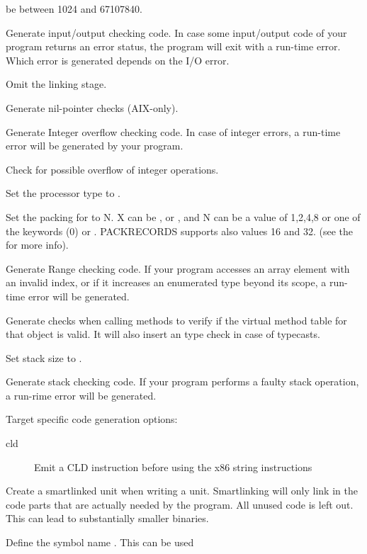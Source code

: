 \begin{description}
be between 1024 and 67107840.
\item [-Ci]  Generate input/output checking code. In case some
input/output code of your program returns an error status, the program will
exit with a run-time error. Which error is generated depends on the I/O error.
\item [-Cn]  Omit the linking stage.
\item [-CN]  Generate nil-pointer checks (AIX-only).
\item [-Co]  Generate Integer overflow checking code. In case of
integer errors, a run-time error will be generated by your program.
\item [-CO]  Check for possible overflow of integer operations.
\item [-CpXXX] Set the processor type to .
\item [-CPX=N] Set the packing for  to N. X can be ,
 or , and N can be a value of 1,2,4,8 or one
of the keywords  (0) or . PACKRECORDS supports also
values 16 and 32.  (see the \progref for more info).
\item [-Cr]  Generate Range checking code. If your program
accesses an array element with an invalid index, or if it increases an
enumerated type beyond its scope, a run-time error will be generated.
\item [-CR]  Generate checks when calling methods to verify
if the virtual method table for that object is valid. It will also insert an type check in case of typecasts.
\item [-Csxxx]  Set stack size to .
\item [-Ct]  Generate stack checking code. If your program
performs a faulty stack operation, a run-rime error will be generated.
\item [-CTNNN]  Target specific code generation options:
\begin{description}
\item [cld]Emit a CLD instruction before using the x86 string instructions
\end{description}
\item [-CX]  Create a smartlinked unit when writing a unit.
Smartlinking will only link in the code parts that are actually needed by
the program. All unused code is left out. This can lead to substantially
smaller binaries.
\item [-dxxx]  Define the symbol name . This can be used

\end{description}
